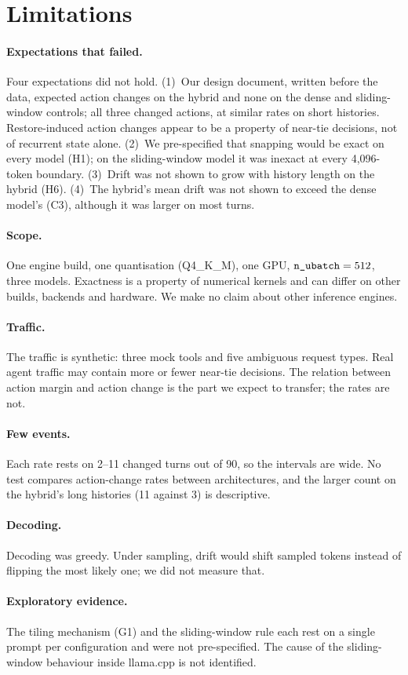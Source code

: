 \section{Limitations}
\label{sec:limits}

\paragraph{Expectations that failed.}
Four expectations did not hold. (1)~Our design document, written before the
data, expected action changes on the hybrid and none on the dense and
sliding-window controls; all three changed actions, at similar rates on short
histories. Restore-induced action changes appear to be a property of near-tie
decisions, not of recurrent state alone. (2)~We pre-specified that snapping
would be exact on every model (H1); on the sliding-window model it was inexact
at every 4{,}096-token boundary. (3)~Drift was not shown to grow with history
length on the hybrid (H6). (4)~The hybrid's mean drift was not shown to exceed
the dense model's (C3), although it was larger on most turns.

\paragraph{Scope.}
One engine build, one quantisation (Q4\_K\_M), one GPU, $\texttt{n\_ubatch} = 512$, three
models. Exactness is a property of numerical kernels and can differ on other
builds, backends and hardware. We make no claim about other inference engines.

\paragraph{Traffic.}
The traffic is synthetic: three mock tools and five ambiguous request types.
Real agent traffic may contain more or fewer near-tie decisions. The relation
between action margin and action change is the part we expect to transfer; the
rates are not.

\paragraph{Few events.}
Each rate rests on 2--11 changed turns out of 90, so the intervals are wide.
No test compares action-change rates between architectures, and the larger
count on the hybrid's long histories (11 against 3) is descriptive.

\paragraph{Decoding.}
Decoding was greedy. Under sampling, drift would shift sampled tokens instead
of flipping the most likely one; we did not measure that.

\paragraph{Exploratory evidence.}
The tiling mechanism (G1) and the sliding-window rule each rest on a single
prompt per configuration and were not pre-specified. The cause of the
sliding-window behaviour inside llama.cpp is not identified.
